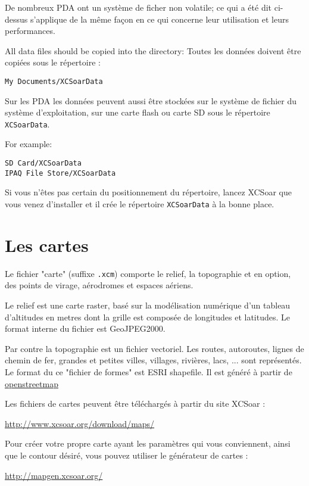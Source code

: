De nombreux PDA ont un système de ficher non volatile; ce qui a été dit ci-dessus s'applique de la même façon en ce qui concerne leur utilisation et leurs performances.

All data files should be copied into the directory: 
Toutes les données doivent être copiées sous le répertoire :
\begin{verbatim}
My Documents/XCSoarData
\end{verbatim}

Sur les PDA les données peuvent aussi être stockées sur le système de fichier du système d'exploitation, sur une carte flash ou carte SD sous le répertoire
\verb|XCSoarData|.

For example:
\begin{verbatim}
SD Card/XCSoarData
IPAQ File Store/XCSoarData
\end{verbatim}

Si vous n'êtes pas certain du positionnement du répertoire, lancez XCSoar que vous venez d'installer et il crée le répertoire \verb|XCSoarData| à la bonne place.

\section{Les cartes}\label{sec:map}

Le fichier "carte" (suffixe \verb|.xcm|) comporte le relief, la topographie et en option, des points de virage, aérodromes et espaces aériens.

Le relief est une carte raster, basé sur la modélisation numérique d'un tableau d'altitudes en metres dont la grille est composée de longitudes et latitudes. Le format interne du fichier est GeoJPEG2000.

Par contre la topographie est un fichier vectoriel. Les routes, autoroutes, lignes de chemin de fer, grandes et petites villes, villages, rivières, lacs, ... sont représentés. Le format du ce "fichier de formes" est ESRI shapefile. Il est généré à partir de  {\href{http://www.openstreetmap.org/}{openstreetmap}}

Les fichiers de cartes peuvent être téléchargés à partir du site XCSoar :

\url{http://www.xcsoar.org/download/maps/}

Pour créer votre propre carte ayant les paramètres qui vous conviennent, ainsi que le contour désiré, vous pouvez utiliser le générateur de cartes :

\url{http://mapgen.xcsoar.org/}

